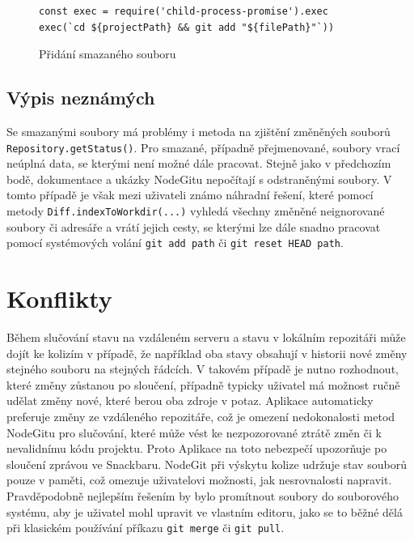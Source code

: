 \FloatBarrier
\begin{figure}[h]
	\begin{verbatim}
const exec = require('child-process-promise').exec
exec(`cd ${projectPath} && git add "${filePath}"`))
	\end{verbatim}
	\caption{Přidání smazaného souboru}
\end{figure}
\FloatBarrier

\subsection{Výpis neznámých}

Se smazanými soubory má problémy i metoda na zjištění změněných souborů \texttt{Repository.getStatus()}. Pro smazané, případně přejmenované, soubory vrací neúplná data, se kterými není možné dále pracovat. Stejně jako v předchozím bodě, dokumentace a ukázky NodeGitu nepočítají s odstraněnými soubory. V tomto případě je však mezi uživateli známo náhradní řešení, které pomocí metody \texttt{Diff.indexToWorkdir(...)} vyhledá všechny změněné neignorované soubory či adresáře a vrátí jejich cesty, se kterými lze dále snadno pracovat pomocí systémových volání \texttt{git add path} či \texttt{git reset HEAD path}.

\section{Konflikty}

Během slučování stavu na vzdáleném serveru a stavu v lokálním repozitáři může dojít ke kolizím v případě, že například oba stavy obsahují v historii nové změny stejného souboru na stejných řádcích. V takovém případě je nutno rozhodnout, které změny zůstanou po sloučení, případně typicky uživatel má možnost ručně udělat změny nové, které berou oba zdroje v potaz. Aplikace automaticky preferuje změny ze vzdáleného repozitáře, což je omezení nedokonalosti metod NodeGitu pro slučování, které může vést ke nezpozorované ztrátě změn či k nevalidnímu kódu projektu. Proto Aplikace na toto nebezpečí upozorňuje po sloučení zprávou ve Snackbaru. NodeGit při výskytu kolize udržuje stav souborů pouze v paměti, což omezuje uživatelovi možnosti, jak nesrovnalosti napravit. Pravděpodobně nejlepším řešením by bylo promítnout soubory do souborového systému, aby je uživatel mohl upravit ve vlastním editoru, jako se to běžné dělá při klasickém používání příkazu \texttt{git merge} či \texttt{git pull}.

